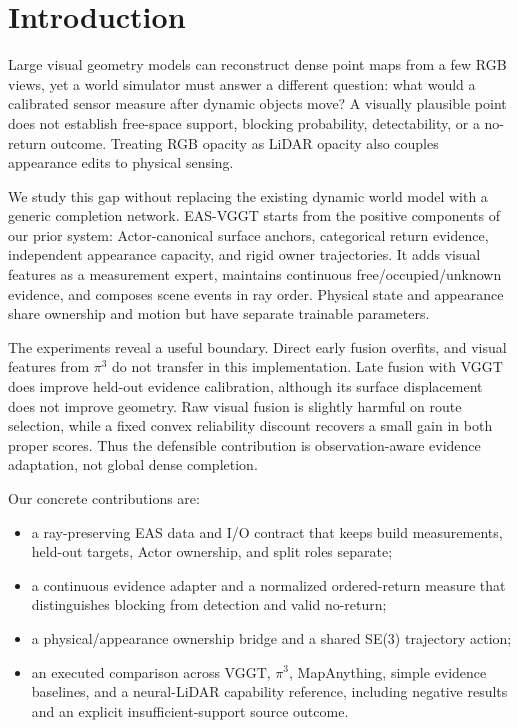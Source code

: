 \section{Introduction}
Large visual geometry models can reconstruct dense point maps from a few RGB views,
yet a world simulator must answer a different question: what would a calibrated sensor
measure after dynamic objects move? A visually plausible point does not establish
free-space support, blocking probability, detectability, or a no-return outcome.
Treating RGB opacity as LiDAR opacity also couples appearance edits to physical sensing.

We study this gap without replacing the existing dynamic world model with a generic
completion network. EAS-VGGT starts from the positive components of our prior system:
Actor-canonical surface anchors, categorical return evidence, independent appearance
capacity, and rigid owner trajectories. It adds visual features as a measurement
expert, maintains continuous free/occupied/unknown evidence, and composes scene events
in ray order. Physical state and appearance share ownership and motion but have
separate trainable parameters.

The experiments reveal a useful boundary. Direct early fusion overfits, and visual
features from $\pi^3$ do not transfer in this implementation. Late fusion with VGGT
does improve held-out evidence calibration, although its surface displacement does not
improve geometry. Raw visual fusion is slightly harmful on route selection, while a
fixed convex reliability discount recovers a small gain in both proper scores. Thus
the defensible contribution is observation-aware evidence adaptation, not global dense
completion.

Our concrete contributions are:
\begin{itemize}
  \item a ray-preserving EAS data and I/O contract that keeps build measurements,
  held-out targets, Actor ownership, and split roles separate;
  \item a continuous evidence adapter and a normalized ordered-return measure that
  distinguishes blocking from detection and valid no-return;
  \item a physical/appearance ownership bridge and a shared SE(3) trajectory action;
  \item an executed comparison across VGGT, $\pi^3$, MapAnything, simple evidence
  baselines, and a neural-LiDAR capability reference, including negative results and an
  explicit insufficient-support source outcome.
\end{itemize}
